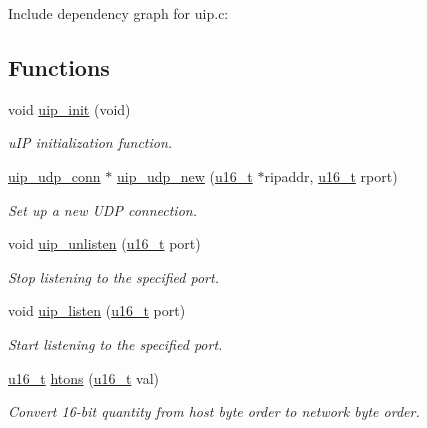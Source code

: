 Include dependency graph for uip.c:\subsection*{Functions}
\begin{CompactItemize}
\item 
void \hyperlink{a00059_gc48ed5f0d27721ef62a3ed02a5ad8d2e}{uip\_\-init} (void)
\begin{CompactList}\small\item\em u\-IP initialization function. \item\end{CompactList}\item 
\hyperlink{a00032}{uip\_\-udp\_\-conn} $\ast$ \hyperlink{a00059_g527ff0e535266167077b06d3a4742822}{uip\_\-udp\_\-new} (\hyperlink{a00070_gfc6499c1f28697aa3bfc2804d496fd11}{u16\_\-t} $\ast$ripaddr, \hyperlink{a00070_gfc6499c1f28697aa3bfc2804d496fd11}{u16\_\-t} rport)
\begin{CompactList}\small\item\em Set up a new UDP connection. \item\end{CompactList}\item 
void \hyperlink{a00059_gaa585784b0914cac1d37f07f85457008}{uip\_\-unlisten} (\hyperlink{a00070_gfc6499c1f28697aa3bfc2804d496fd11}{u16\_\-t} port)
\begin{CompactList}\small\item\em Stop listening to the specified port. \item\end{CompactList}\item 
void \hyperlink{a00059_gdd1ab3704ecd4900eec61a6897d32dc8}{uip\_\-listen} (\hyperlink{a00070_gfc6499c1f28697aa3bfc2804d496fd11}{u16\_\-t} port)
\begin{CompactList}\small\item\em Start listening to the specified port. \item\end{CompactList}\item 
\hyperlink{a00070_gfc6499c1f28697aa3bfc2804d496fd11}{u16\_\-t} \hyperlink{a00059_ga22b04cac8cf283ca12f028578bebc06}{htons} (\hyperlink{a00070_gfc6499c1f28697aa3bfc2804d496fd11}{u16\_\-t} val)
\begin{CompactList}\small\item\em Convert 16-bit quantity from host byte order to network byte order. \item\end{CompactList}\end{CompactItemize}
